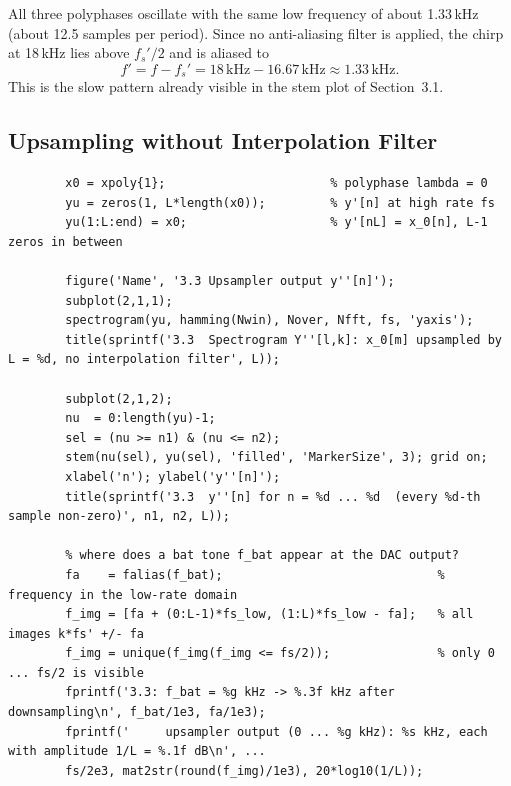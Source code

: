 \documentclass[a4paper,11pt]{article}
\begin{document}
	All three polyphases oscillate with the same low frequency of about 1.33\,kHz (about 12.5 samples per period). Since no anti-aliasing filter is applied, the chirp at 18\,kHz lies above $f_s'/2$ and is aliased to
	\[
	f' = f - f_s' = 18\,\text{kHz} - 16.67\,\text{kHz} \approx 1.33\,\text{kHz}.
	\]
	This is the slow pattern already visible in the stem plot of Section~3.1.
	
	\subsection{Upsampling without Interpolation Filter}
	
	\noindent{}
	
	\medskip
	
	\begin{lstlisting}[style=matlab, caption={MATLAB code, Section 3.3}, label={lst:m33}]
		%% 3.3 Upsampling of x_0[m] by L WITHOUT interpolation filter
		x0 = xpoly{1};                       % polyphase lambda = 0
		yu = zeros(1, L*length(x0));         % y'[n] at high rate fs
		yu(1:L:end) = x0;                    % y'[nL] = x_0[n], L-1 zeros in between
		
		figure('Name', '3.3 Upsampler output y''[n]');
		subplot(2,1,1);
		spectrogram(yu, hamming(Nwin), Nover, Nfft, fs, 'yaxis');
		title(sprintf('3.3  Spectrogram Y''[l,k]: x_0[m] upsampled by L = %d, no interpolation filter', L));
		
		subplot(2,1,2);
		nu  = 0:length(yu)-1;
		sel = (nu >= n1) & (nu <= n2);
		stem(nu(sel), yu(sel), 'filled', 'MarkerSize', 3); grid on;
		xlabel('n'); ylabel('y''[n]');
		title(sprintf('3.3  y''[n] for n = %d ... %d  (every %d-th sample non-zero)', n1, n2, L));
		
		% where does a bat tone f_bat appear at the DAC output?
		fa    = falias(f_bat);                              % frequency in the low-rate domain
		f_img = [fa + (0:L-1)*fs_low, (1:L)*fs_low - fa];   % all images k*fs' +/- fa
		f_img = unique(f_img(f_img <= fs/2));               % only 0 ... fs/2 is visible
		fprintf('3.3: f_bat = %g kHz -> %.3f kHz after downsampling\n', f_bat/1e3, fa/1e3);
		fprintf('     upsampler output (0 ... %g kHz): %s kHz, each with amplitude 1/L = %.1f dB\n', ...
		fs/2e3, mat2str(round(f_img)/1e3), 20*log10(1/L));
	\end{lstlisting}
	
\end{document}
